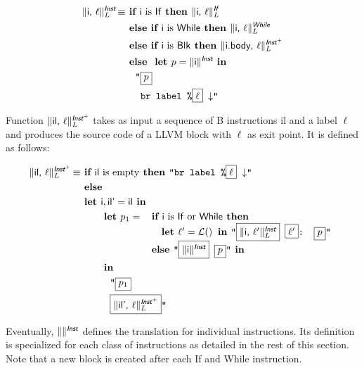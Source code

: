 \documentclass{llncs}
\newcommand{\trad}[2]{\ensuremath{\lVert \textsf{#1} \rVert^{\textit{#2}}}}
\newcommand{\nl}[0]{\ensuremath{\downarrow}}
\DeclareMathOperator{\isdef}{\equiv}
\DeclareMathOperator{\lbl}{\mathcal{L}()}
\newcommand{\llvm}[1]{\texttt{#1}}
\newcommand{\B}[1]{\textsf{#1}}
\newcommand{\ListOf}[1]{$\mbox{#1}^+$}
\newcommand{\IF}[0]{\textbf{ if }}
\newcommand{\ELSIF}[0]{\textbf{ else if }}
\newcommand{\ELSE}[0]{\textbf{ else }}
\newcommand{\THEN}[0]{\textbf{ then }}
\newcommand{\LET}[0]{\textbf{ let }}
\newcommand{\IN}[0]{\textbf{ in }}
\newcommand{\PH}[1]{\framebox{$#1$}}
\begin{document}
\begin{enumerate}
\begin{align*}
\trad{\B{i}, $\ell$}{\B{Inst}}_L \isdef
& \IF \B{i} \mbox{ is \B{If}} \THEN \trad{\B{i}, $\ell$}{\B{If}}_L \\
& \ELSIF \B{i} \mbox{ is \B{While}} \THEN \trad{\B{i}, $\ell$}{\B{While}}_L \\
& \ELSIF \B{i} \mbox{ is \B{Blk}} \THEN \trad{\B{i.body}, $\ell$}{\ListOf{\B{Inst}}}_L \\
& \ELSE \LET p = \trad{\B{i}}{\B{Inst}} \IN \\
& \quad \llvm{"\PH{p}} \\
& \quad \llvm{ br label \%\PH{\ell} \nl"}
\end{align*}

Function $\trad{\B{il}, $\ell$}{\ListOf{\B{Inst}}}_L$ takes as input a sequence
of B instructions \B{il} and a label $\ell$ and produces the source code of a
LLVM block with $\ell$ as exit point. It is defined as follows: 

\begin{align*}
\trad{\B{il}, $\ell$}{\ListOf{\B{Inst}}}_L \isdef & \IF \B{il} \mbox{ is empty} \THEN \llvm{"br label \%\PH{\ell} \nl"} \\
& \ELSE \\
& \LET \B{i}, \B{il'} = \B{il}  \IN \\
& \quad \quad \LET p_1 = 
\begin{array}[t]{l}
  \IF \B{i} \mbox{ is \B{If} or \B{While}} \THEN \\
  \quad \LET \ell' = \lbl \IN \llvm{"\PH{\trad{i, $\ell'$}{\B{Inst}}_L} \PH{\ell'}: \PH{p}"} \\
  \ELSE \llvm{"\PH{\trad{i}{\B{Inst}}} \PH{p}"} \IN
\end{array} \\
& \quad \quad \IN \\
& \quad \quad \quad \llvm{"\PH{p_1}} \\
& \quad \quad \quad \llvm{\PH{\trad{il', $\ell$}{\ListOf{\B{Inst}}}_L}"}
\end{align*}

Eventually, $\trad{}{\B{Inst}}$ defines the translation for individual
instructions. Its definition is specialized for each class of instructions as
detailed in the rest of this section. Note that a new block is created after
each \B{If} and \B{While} instruction.


\end{enumerate}
\end{document}
